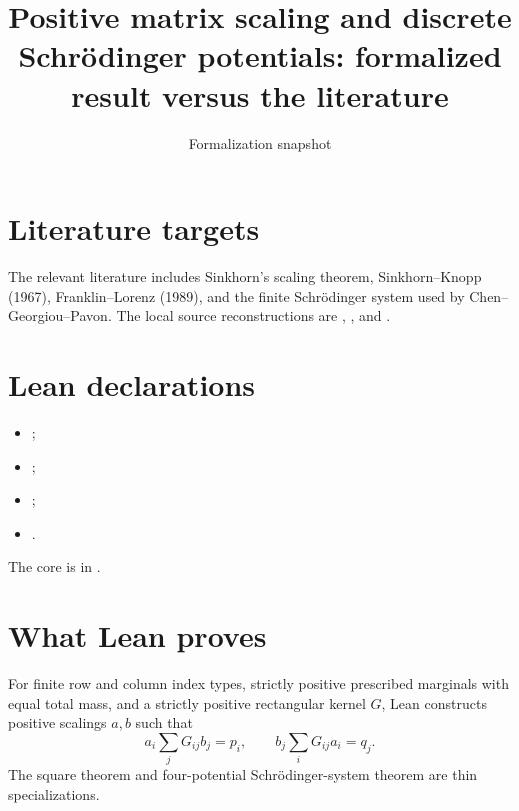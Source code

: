 \title{Positive matrix scaling and discrete Schrödinger potentials: formalized result versus the literature}
\author{}
\date{Formalization snapshot \snapshot}

\maketitle
{}
\section{Literature targets}
The relevant literature includes Sinkhorn's scaling theorem, Sinkhorn--Knopp (1967), Franklin--Lorenz (1989), and the finite Schrödinger system used by Chen--Georgiou--Pavon.  The local source reconstructions are
,
, and
.

\section{Lean declarations}
\begin{itemize}[leftmargin=2em]
\item {};
\item {};
\item {};
\item {}.
\end{itemize}
The core is in .

\section{What Lean proves}
For finite row and column index types, strictly positive prescribed marginals with equal total mass, and a strictly positive rectangular kernel $G$, Lean constructs positive scalings $a,b$ such that
\[
 a_i\sum_jG_{ij}b_j=p_i,
 \qquad
 b_j\sum_iG_{ij}a_i=q_j.
\]
The square theorem and four-potential Schrödinger-system theorem are thin specializations.


